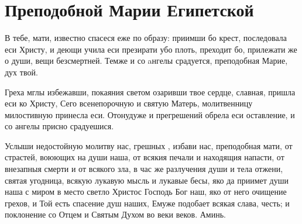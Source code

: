 \section{Преподобной Марии Египетской}\begin{mymulticols}

\ifpdf
\else
\fi


В тебе, мати, известно спасеся еже по образу: приимши бо крест, последовала еси Христу, и деющи учила еси презирати убо плоть, преходит бо, прилежати же о души, вещи безсмертней. Темже и со aнгелы срадуется, преподобная Марие, дух твой.


Греха мглы избежавши, покаяния светом озаривши твое сердце, славная, пришла еси ко Христу, Сего всенепорочную и святую Матерь, молитвенницу милостивную принесла еси. Отонудуже и прегрешений обрела еси оставление, и со ангелы присно срадуешися.


Услыши недостойную молитву нас, грешных , избави нас, преподобная мати, от страстей, воюющих на души наша, от всякия печали и находящия напасти, от внезапныя смерти и от всякого зла, в час же разлучения души и тела отжени, святая угодница, всякую лукавую мысль и лукавые бесы, яко да приимет души наша с миром в место светло Христос Господь Бог наш, яко от него очищение грехов, и Той есть спасение душ наших, Емуже подобает всякая слава, честь; и поклонение со Отцем и Святым Духом во веки веков. Аминь.

\ifpdf
\else
\fi

\end{mymulticols}

